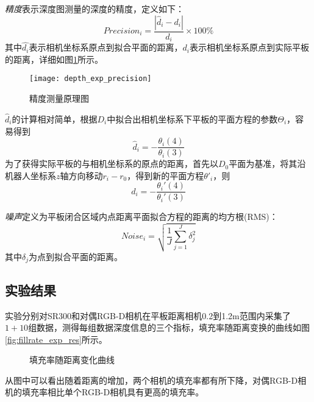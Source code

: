 \emph{精度}表示深度图测量的深度的精度，定义如下：
\begin{equation}
  Precision_i = \frac{|\hat{d}_i-d_i|}{d_i} \times 100\%
\end{equation}
其中$\hat{d_i}$表示相机坐标系原点到拟合平面的距离，$d_i$表示相机坐标系原点到实际平板的距离，详细如图\ref{fig:depth_exp_precision}所示。
\begin{figure}
  \centering
  \texttt{[image: depth\_exp\_precision]}
  \caption{精度测量原理图}
  \label{fig:depth_exp_precision}
\end{figure}
$\hat{d}_i$的计算相对简单，根据$D_i$中拟合出相机坐标系下平板的平面方程的参数$\Theta_i$，容易得到
\begin{equation}
  \hat{d}_i = -\frac{\theta_i(4)}{\theta_i(3)}
\end{equation}
为了获得实际平板的与相机坐标系的原点的距离，首先以$D_0$平面为基准，将其沿机器人坐标系$z$轴方向移动$r_i-r_0$，得到新的平面方程$\theta'_i$，则
\begin{equation}
  d_i = -\frac{\theta_i'(4)}{\theta_i'(3)}
\end{equation}

\emph{噪声}定义为平板闭合区域内点距离平面拟合方程的距离的均方根(RMS)：
\begin{equation}
  Noise_i = \sqrt{\frac{1}{J}\sum_{j=1}^J{\delta_j^2}}
\end{equation}
其中$\delta_j$为点到拟合平面的距离。

\subsection{实验结果}
实验分别对SR300和对偶RGB-D相机在平板距离相机0.2到1.2m范围内采集了$1 + 10$组数据，测得每组数据深度信息的三个指标，填充率随距离变换的曲线如图\ref{fig:fillrate_exp_res}所示。
\begin{figure}[ht]
  \centering
  \caption{填充率随距离变化曲线}
  \label{fig:fillrate}
\end{figure}
从图中可以看出随着距离的增加，两个相机的填充率都有所下降，对偶RGB-D相机的填充率相比单个RGB-D相机具有更高的填充率。

